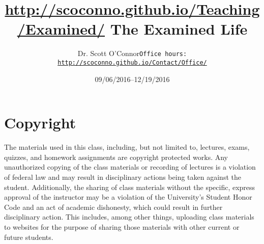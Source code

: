 \documentclass[article,oneside]{memoir}
\def\myauthor{Author}
\def\mytitle{Title}
\def\mycopyright{\myauthor}
\def\myweb{\href{http://scoconno.github.io/Teaching/Examined/}{http://scoconno.github.io/Teaching/Examined/}}
\def\myauthor{Dr. Scott O'Connor}
\def\mytitle{{\normalsize \myweb \newline} \HUGE The Examined Life}
\begin{document}
\setsansfont[Mapping=tex-text]{Myriad Pro} 
\setmonofont[Mapping=tex-text,Scale=0.8]{Georgia} 

\def\ind{\hangindent=1 true cm\hangafter=1 \noindent}
\def\labelitemi{$\cdot$}


\title{\LARGE \mytitle}     
\author{\Large\myauthor \newline \footnotesize\texttt{\noindent Office hours: \href{http://scoconno.github.io/Contact/Office/}{http://scoconno.github.io/Contact/Office/}}}
\date{09/06/2016--12/19/2016}


\maketitle




%
%

\section{Copyright}
The materials used in this class, including, but not limited to, lectures, exams, quizzes, and homework assignments are copyright protected works.  Any unauthorized copying of the class materials or recording of lectures is a violation of federal law and may result in disciplinary actions being taken against the student.  Additionally, the sharing of class materials without the specific, express approval of the instructor may be a violation of the University's Student Honor Code and an act of academic dishonesty, which could result in further disciplinary action.  This includes, among other things, uploading class materials to websites for the purpose of sharing those materials with other current or future students. 
\end{document}
